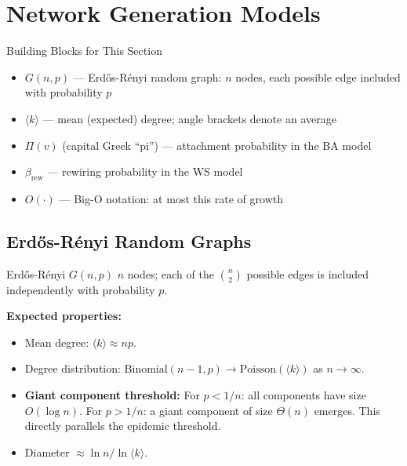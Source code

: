 \section{Network Generation Models}
\label{sec:network_models}

\begin{conceptbox}{Building Blocks for This Section}
\begin{itemize}[noitemsep]
    \item $G(n,p)$ --- Erd\H{o}s-R\'enyi random graph: $n$ nodes, each possible edge included with probability $p$
    \item $\langle k \rangle$ --- mean (expected) degree; angle brackets denote an average
    \item $\Pi(v)$ (capital Greek ``pi'') --- attachment probability in the BA model
    \item $\beta_{\mathrm{rew}}$ --- rewiring probability in the WS model
    \item $O(\cdot)$ --- Big-O notation: at most this rate of growth
\end{itemize}
\end{conceptbox}

\subsection{Erd\H{o}s-R\'{e}nyi Random Graphs}

\begin{conceptbox}{Erd\H{o}s-R\'{e}nyi $G(n,p)$}
$n$ nodes; each of the $\binom{n}{2}$ possible edges is included independently with probability $p$.

\textbf{Expected properties:}
\begin{itemize}[noitemsep]
    \item Mean degree: $\langle k \rangle \approx np$.
    \item Degree distribution: $\mathrm{Binomial}(n-1,p) \to \mathrm{Poisson}(\langle k \rangle)$ as $n \to \infty$.
    \item \textbf{Giant component threshold:} For $p < 1/n$: all components have size $O(\log n)$. For $p > 1/n$: a giant component of size $\Theta(n)$ emerges. This directly parallels the epidemic threshold.
    \item Diameter $\approx \ln n / \ln \langle k \rangle$.
\end{itemize}
\end{conceptbox}

